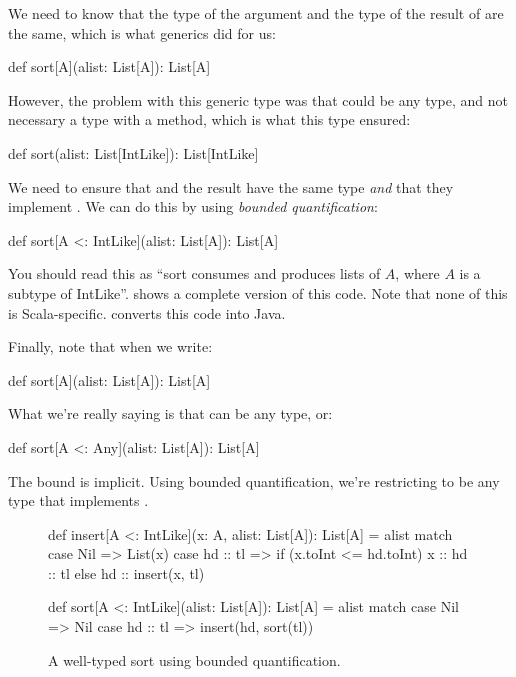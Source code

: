 \documentclass{book}
\begin{document}
We need to know that the type of the argument and the type of the result
of  are the same, which is what generics did for us:
%
\begin{scalacode}
def sort[A](alist: List[A]): List[A]
\end{scalacode}
However, the problem with this generic type was that  could
be any type, and not necessary a type with a  method,
which is what this type ensured:
\begin{scalacode}
def sort(alist: List[IntLike]): List[IntLike]
\end{scalacode}
We need to
ensure that  and the result have the same type \emph{and}
that they implement . We can do this by using
\emph{bounded quantification}:
\begin{scalacode}
def sort[A <: IntLike](alist: List[A]): List[A]
\end{scalacode}
You should read this as ``sort consumes and produces lists of $A$, where $A$
is a subtype of IntLike''.  shows a complete version of this code.
Note that none of this is Scala-specific.  converts
this code into Java.

Finally, note that when we write:
\begin{scalacode}
def sort[A](alist: List[A]): List[A]
\end{scalacode}
What we're really saying is that  can be any type, or:
%
\begin{scalacode}
def sort[A <: Any](alist: List[A]): List[A]
\end{scalacode}
%
The bound  is implicit. Using bounded quantification, we're restricting  to be any
type that implements .

\begin{figure}
\begin{scalacode}
def insert[A <: IntLike](x: A, alist: List[A]): List[A] = alist match {
  case Nil => List(x)
  case hd :: tl => if (x.toInt <= hd.toInt) { x :: hd :: tl } else { hd :: insert(x, tl) }
}

def sort[A <: IntLike](alist: List[A]): List[A] = alist match {
  case Nil => Nil
  case hd :: tl => insert(hd, sort(tl))
}
\end{scalacode}
\caption{A well-typed sort using bounded quantification.}
\label{sort_bq}
\end{figure}
\end{document}
